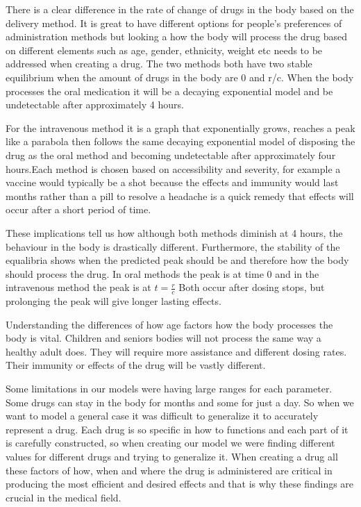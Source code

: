 \documentclass{article}
\begin{document}
There is a clear difference in the rate of change of drugs in the body based on the delivery method. It is great to have different options for people's preferences of administration methods but looking a how the body will process the drug based on different elements such as age, gender, ethnicity, weight etc needs to be addressed when creating a drug. The two methods both have two stable equilibrium when the amount of drugs in the body are 0 and r/c. When the body processes the oral medication it will be a decaying exponential model and be undetectable after approximately 4 hours. 

For the intravenous method it is a graph that exponentially grows, reaches a peak like a parabola then follows the same decaying exponential model of disposing the drug as the oral method and becoming undetectable after approximately four hours.Each method is chosen based on accessibility and severity, for example a vaccine would typically be a shot because the effects and immunity would last months rather than a pill to resolve a headache is a quick remedy that effects will occur after a short period of time. 

These implications tell us how although both methods diminish at 4 hours, the behaviour in the body is drastically different. Furthermore, the stability of the equalibria shows when the predicted peak should be and therefore how the body should process the drug. In oral methods the peak is at time 0 and in the intravenous method the peak is at $t= \frac{r}{c}$ Both occur after dosing stops, but prolonging the peak will give longer lasting effects. 

Understanding the differences of how age factors how the body processes the body is vital. Children and seniors bodies will not process the same way a healthy adult does. They will require more assistance and different dosing rates. Their immunity or effects of the drug will be vastly different.

Some limitations in our models were having large ranges for each parameter. Some drugs can stay in the body for months and some for just a day. So when we want to model a general case it was difficult to generalize it to accurately represent a drug. Each drug is so specific in how to functions and each part of it is carefully constructed, so when creating our model we were finding different values for different drugs and trying to generalize it. When creating a drug all these factors of how, when and where the drug is administered are critical in producing the most efficient and desired effects and that is why these findings are crucial in the medical field. 
\end{document}
